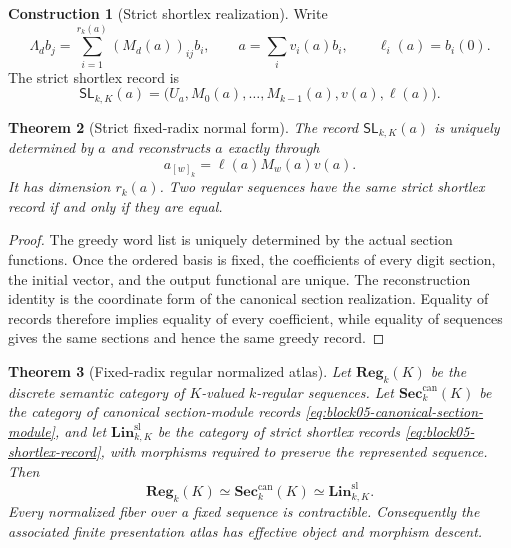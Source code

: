 \documentclass[11pt]{article}
\newtheorem{theorem}{Theorem}[section]
\theoremstyle{definition}
\newtheorem{construction}[theorem]{Construction}
\theoremstyle{remark}
\begin{document}
\begin{construction}[Strict shortlex realization]
\label{con:block05-shortlex}
Write
\[
\Lambda_db_j
=
\sum_{i=1}^{r_k(a)}(M_d(a))_{ij}b_i,
\qquad
 a=\sum_i v_i(a)b_i,
\qquad
\ell_i(a)=b_i(0).
\]
The strict shortlex record is
\begin{equation}
\mathsf{SL}_{k,K}(a)
=
\bigl(
U_a,
M_0(a),\ldots,M_{k-1}(a),
 v(a),
\ell(a)
\bigr).
\label{eq:block05-shortlex-record}
\end{equation}
\end{construction}

\begin{theorem}[Strict fixed-radix normal form]
\label{thm:block05-shortlex-normal-form}
The record \(\mathsf{SL}_{k,K}(a)\) is uniquely determined by \(a\) and reconstructs \(a\) exactly through
\[
a_{[w]_k}
=
\ell(a)M_w(a)v(a).
\]
It has dimension \(r_k(a)\).  Two regular sequences have the same strict shortlex record if and only if they are equal.
\end{theorem}

\begin{proof}
The greedy word list is uniquely determined by the actual section functions.  Once the ordered basis is fixed, the coefficients of every digit section, the initial vector, and the output functional are unique.  The reconstruction identity is the coordinate form of the canonical section realization.  Equality of records therefore implies equality of every coefficient, while equality of sequences gives the same sections and hence the same greedy record.
\end{proof}

\begin{theorem}[Fixed-radix regular normalized atlas]
\label{thm:block05-regular-atlas}
Let \(\mathbf{Reg}_k(K)\) be the discrete semantic category of \(K\)-valued \(k\)-regular sequences.  Let \(\mathbf{Sec}_k^{\mathrm{can}}(K)\) be the category of canonical section-module records \eqref{eq:block05-canonical-section-module}, and let \(\mathbf{Lin}_{k,K}^{\mathrm{sl}}\) be the category of strict shortlex records \eqref{eq:block05-shortlex-record}, with morphisms required to preserve the represented sequence.  Then
\begin{equation}
\boxed{
\mathbf{Reg}_k(K)
\simeq
\mathbf{Sec}_k^{\mathrm{can}}(K)
\simeq
\mathbf{Lin}_{k,K}^{\mathrm{sl}}.
}
\label{eq:block05-regular-atlas-equivalence}
\end{equation}
Every normalized fiber over a fixed sequence is contractible.  Consequently the associated finite presentation atlas has effective object and morphism descent.
\end{theorem}
\end{document}
